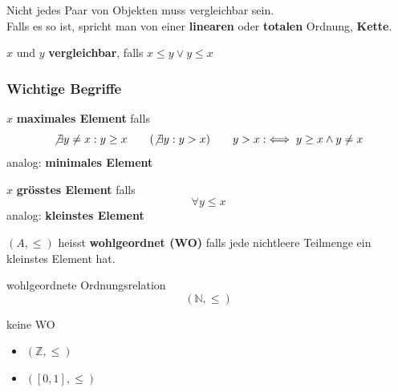 \begin{bem}
	Nicht jedes Paar von Objekten muss vergleichbar sein.\\
	Falls es so ist, spricht man von einer \textbf{linearen} oder \textbf{totalen} Ordnung, \textbf{Kette}.
\end{bem}
\begin{def*}[note = vergleichbar , index = vergleichbar]
	$x$ und $y$ \textbf{vergleichbar}, falls $x \leq y \vee y \leq x$
\end{def*}

\subsubsection{Wichtige Begriffe}
\begin{def*}[note = maximales Element , index = Element!maximales]
	$x$ \textbf{maximales Element} falls \\
	\[ \not\exists y \neq x : y \geq x \qquad (\not\exists y : y > x) \qquad y > x :\iff y \geq x \wedge y \neq x \]
	analog: \textbf{minimales Element}
\end{def*}
\begin{def*}[note = grösstes Element , index = Element!grösstes]
	$x$ \textbf{grösstes Element} falls \\
	\[ \forall y \leq x \]
	analog: \textbf{kleinstes Element}
\end{def*}
\begin{def*}[note = wohlgeordnet , index = wohlgeordnet]
	$(A, \leq)$ heisst \textbf{wohlgeordnet (WO)} falls jede nichtleere Teilmenge ein kleinstes Element hat. \\
	\begin{bsp*}{wohlgeordnete Ordnungsrelation}
		\[ (\mathbb{N}, \leq ) \]
	\end{bsp*}
	\begin{bsp*}{keine WO}
		\begin{itemize}
			\item $(\mathbb{Z}, \leq )$
			\item $([0,1], \leq)$
		\end{itemize}
	\end{bsp*}
\end{def*}

